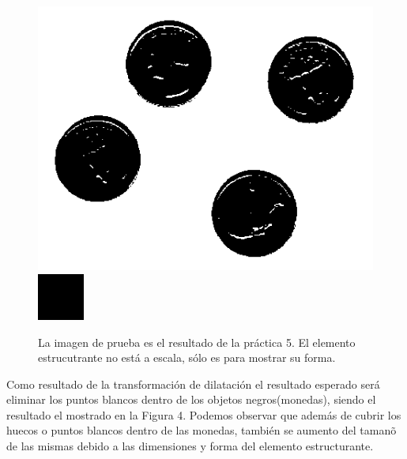 \documentclass[conference]{IEEEtran}
\begin{document}
\begin{figure}[h]
	\begin{center}
		\setlength{\unitlength}{0.00105in}
		\includegraphics[scale=0.27]{./images/coins.png}
		\includegraphics[scale=0.70]{./images/element.png}
	\end{center}
	\caption{La imagen de prueba es el resultado de la pr\'actica 5. El elemento estrucutrante no est\'a a escala, s\'olo es para mostrar su forma.}
\end{figure}

Como resultado de la transformaci\'on de dilataci\'on el resultado esperado ser\'a eliminar los puntos blancos dentro de los objetos negros(monedas), siendo el resultado el mostrado en la Figura 4. Podemos observar que adem\'as de cubrir los huecos o puntos blancos dentro de las monedas, tambi\'en se aumento del taman\~o de las mismas debido a las dimensiones y forma del elemento estructurante.
\end{document}
